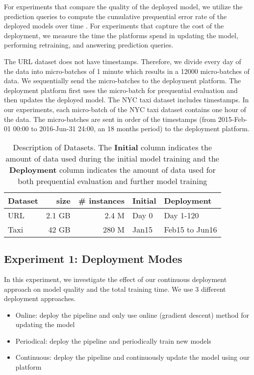 For experiments that compare the quality of the deployed model, we utilize the prediction queries to compute the cumulative prequential error rate of the deployed models over time \cite{dawid1984present}.
For experiments that capture the cost of the deployment, we measure the time the platforms spend in updating the model, performing retraining, and answering prediction queries.

The URL dataset does not have timestamps. 
Therefore, we divide every day of the data into micro-batches of 1 minute which results in a 12000 micro-batches of data.
We sequentially send the micro-batches to the deployment platform.
The deployment platform first uses the micro-batch for prequential evaluation and then updates the deployed model.
The NYC taxi dataset includes timestamps. 
In our experiments, each micro-batch of the NYC taxi dataset contains one hour of the data. 
The micro-batches are sent in order of the timestamps (from 2015-Feb-01  00:00 to 2016-Jun-31 24:00, an 18 months period) to the deployment platform.

\begin{table}[h!]
\centering
\begin{tabular}{lrrll}
\hline
\textbf{Dataset}  & \textbf{size} &\textbf{\# instances} & \textbf{Initial} & \textbf{Deployment} \\
\hline
URL        &  2.1 GB 	& 2.4 M  			& Day 0        	  & Day 1-120          \\
Taxi        &  42 GB 	    & 280 M            & Jan15              & Feb15 to Jun16    \\
\hline
\end{tabular}
\caption{Description of Datasets. The \textbf{Initial} column indicates the amount of data used during the initial model training and the \textbf{Deployment} column indicates the amount of data used for both prequential evaluation and further model training}  
\label{dataset-description}
\end{table}


\subsection{Experiment 1: Deployment Modes}
In this experiment, we investigate the effect of our continuous deployment approach on model quality and the total training time.
We use 3 different deployment approaches.
\begin{itemize}
\item Online: deploy the pipeline and only use online (gradient descent) method for updating the model
\item Periodical: deploy the pipeline and periodically train new models 
\item Continuous: deploy the pipeline and continuously update the model using our platform
\end{itemize}

